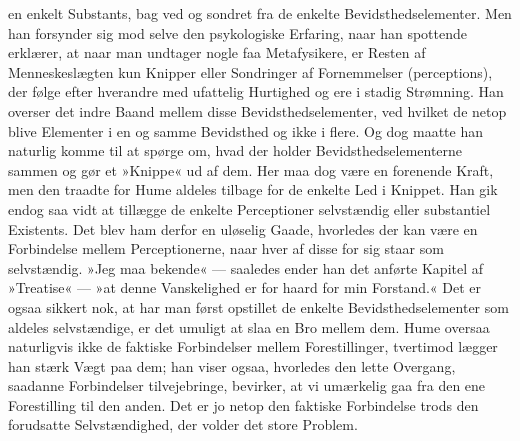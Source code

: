\documentclass[12pt,a4paper,openany]{book}
\newcommand{\opage}[1]{\marginnote{\footnotesize\textit{[#1]}}}
\begin{document}
en enkelt Substants, bag ved og sondret fra de enkelte
Bevidsthedselementer. Men han forsynder sig mod selve den psykologiske
Erfaring, naar han spottende erklærer, at naar man undtager nogle faa
Metafysikere, er Resten af Menneskeslægten kun Knipper eller Sondringer
af Fornemmelser (perceptions), der følge efter hverandre med ufattelig
Hurtighed og ere i stadig Strømning. Han overser det indre Baand mellem
disse Bevidsthedselementer,
\opage{167}ved hvilket de netop blive Elementer i en og samme Bevidsthed
og ikke i flere. Og dog maatte han naturlig komme til at spørge om, hvad
der holder Bevidsthedselementerne sammen og gør et »Knippe« ud af dem.
Her maa dog være en forenende Kraft, men den traadte for Hume aldeles
tilbage for de enkelte Led i Knippet. Han gik endog saa vidt at tillægge
de enkelte Perceptioner selvstændig eller substantiel Existents. Det
blev ham derfor en uløselig Gaade, hvorledes der kan være en Forbindelse
mellem Perceptionerne, naar hver af disse for sig staar som selvstændig.
»Jeg maa bekende« --- saaledes ender han det anførte Kapitel af
»Treatise« --- »at denne Vanskelighed er for haard for min Forstand.«
Det er ogsaa sikkert nok, at har man først opstillet de enkelte
Bevidsthedselementer som aldeles selvstændige, er det umuligt at slaa en
Bro mellem dem. Hume oversaa naturligvis ikke de faktiske Forbindelser
mellem Forestillinger, tvertimod lægger han stærk Vægt paa dem; han
viser ogsaa, hvorledes den lette Overgang, saadanne Forbindelser
tilvejebringe, bevirker, at vi umærkelig gaa fra den ene Forestilling
til den anden. Det er jo netop den faktiske Forbindelse trods den
forudsatte Selvstændighed, der volder det store Problem.
\end{document}
